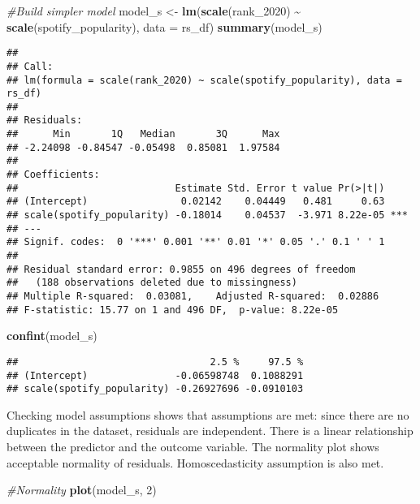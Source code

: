 \documentclass[
]{article}
\newenvironment{Shaded}{\begin{snugshade}}{\end{snugshade}}
\newcommand{\AttributeTok}[1]{\textcolor[rgb]{0.13,0.29,0.53}{#1}}
\newcommand{\CommentTok}[1]{\textcolor[rgb]{0.56,0.35,0.01}{\textit{#1}}}
\newcommand{\DecValTok}[1]{\textcolor[rgb]{0.00,0.00,0.81}{#1}}
\newcommand{\FunctionTok}[1]{\textcolor[rgb]{0.13,0.29,0.53}{\textbf{#1}}}
\newcommand{\NormalTok}[1]{#1}
\newcommand{\OtherTok}[1]{\textcolor[rgb]{0.56,0.35,0.01}{#1}}
\newcommand{\SpecialCharTok}[1]{\textcolor[rgb]{0.81,0.36,0.00}{\textbf{#1}}}
\begin{document}
\begin{Shaded}
\begin{Highlighting}[]
\CommentTok{\#Build simpler model}
\NormalTok{model\_s }\OtherTok{\textless{}{-}} \FunctionTok{lm}\NormalTok{(}\FunctionTok{scale}\NormalTok{(rank\_2020) }\SpecialCharTok{\textasciitilde{}} \FunctionTok{scale}\NormalTok{(spotify\_popularity), }\AttributeTok{data =}\NormalTok{ rs\_df)}
\FunctionTok{summary}\NormalTok{(model\_s)}
\end{Highlighting}
\end{Shaded}

\begin{verbatim}
## 
## Call:
## lm(formula = scale(rank_2020) ~ scale(spotify_popularity), data = rs_df)
## 
## Residuals:
##      Min       1Q   Median       3Q      Max 
## -2.24098 -0.84547 -0.05498  0.85081  1.97584 
## 
## Coefficients:
##                           Estimate Std. Error t value Pr(>|t|)    
## (Intercept)                0.02142    0.04449   0.481     0.63    
## scale(spotify_popularity) -0.18014    0.04537  -3.971 8.22e-05 ***
## ---
## Signif. codes:  0 '***' 0.001 '**' 0.01 '*' 0.05 '.' 0.1 ' ' 1
## 
## Residual standard error: 0.9855 on 496 degrees of freedom
##   (188 observations deleted due to missingness)
## Multiple R-squared:  0.03081,    Adjusted R-squared:  0.02886 
## F-statistic: 15.77 on 1 and 496 DF,  p-value: 8.22e-05
\end{verbatim}

\begin{Shaded}
\begin{Highlighting}[]
\FunctionTok{confint}\NormalTok{(model\_s)}
\end{Highlighting}
\end{Shaded}

\begin{verbatim}
##                                 2.5 %     97.5 %
## (Intercept)               -0.06598748  0.1088291
## scale(spotify_popularity) -0.26927696 -0.0910103
\end{verbatim}

Checking model assumptions shows that assumptions are met: since there
are no duplicates in the dataset, residuals are independent. There is a
linear relationship between the predictor and the outcome variable. The
normality plot shows acceptable normality of residuals. Homoscedasticity
assumption is also met.

\begin{Shaded}
\begin{Highlighting}[]
\CommentTok{\#Normality}
\FunctionTok{plot}\NormalTok{(model\_s, }\DecValTok{2}\NormalTok{)}
\end{Highlighting}
\end{Shaded}
\end{document}
